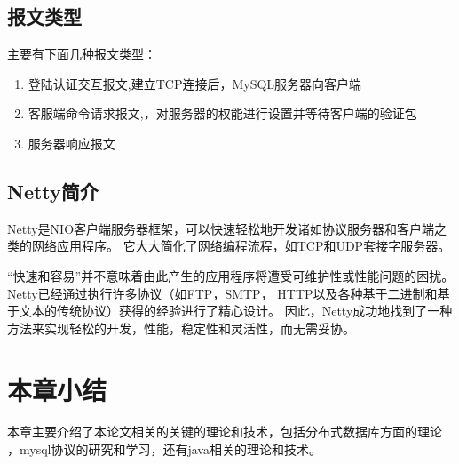\subsection{报文类型}
主要有下面几种报文类型：
\begin{enumerate}
	\item 登陆认证交互报文,建立TCP连接后，MySQL服务器向客户端
	\item 客服端命令请求报文,，对服务器的权能进行设置并等待客户端的验证包
	\item  服务器响应报文
\end{enumerate}
\subsection{Netty简介}
Netty是NIO客户端服务器框架，可以快速轻松地开发诸如协议服务器和客户端之类的网络应用程序。
 它大大简化了网络编程流程，如TCP和UDP套接字服务器。

“快速和容易”并不意味着由此产生的应用程序将遭受可维护性或性能问题的困扰。
 Netty已经通过执行许多协议（如FTP，SMTP，
HTTP以及各种基于二进制和基于文本的传统协议）获得的经验进行了精心设计。
 因此，Netty成功地找到了一种方法来实现轻松的开发，性能，稳定性和灵活性，而无需妥协。
\section{本章小结}
本章主要介绍了本论文相关的关键的理论和技术，包括分布式数据库方面的理论
，mysql协议的研究和学习，还有java相关的理论和技术。
